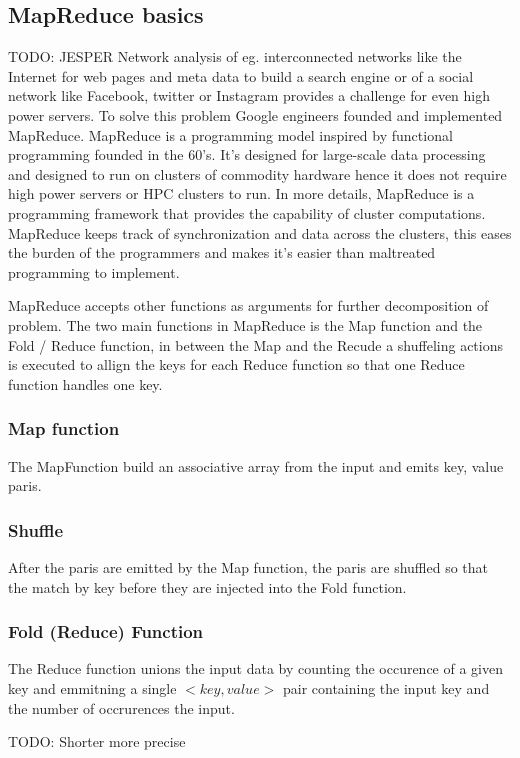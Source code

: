 \documentclass{article}
\begin{document}
\subsection{MapReduce basics}
TODO: JESPER
Network analysis of eg. interconnected networks like the Internet for web pages and meta data to build a search engine or of a social network like Facebook, twitter or Instagram provides a challenge for even high power servers. To solve this problem Google engineers founded and implemented MapReduce. MapReduce is a programming model inspired by functional programming founded in the 60's. It's designed for large-scale data processing and designed to run on clusters of commodity hardware hence it does not require high power servers or HPC clusters to run.
In more details, MapReduce is a programming framework that provides the capability of cluster computations. MapReduce keeps track of synchronization and data across the clusters, this eases the burden of the programmers and makes it's easier than maltreated programming to implement.

\noindent MapReduce accepts other functions as arguments for further decomposition of problem. The two main functions in MapReduce is the Map function and the Fold / Reduce function, in between the Map and the Recude a shuffeling actions is executed to allign the keys for each Reduce function so that one Reduce function handles one key.

\subsubsection{Map function}
The MapFunction build an associative array from the input and emits key, value paris.

\subsubsection{Shuffle}
After the paris are emitted by the Map function, the paris are shuffled so that the match by key before they are injected into the Fold function.

\subsubsection{Fold (Reduce) Function}
The Reduce function unions the input data by counting the occurence of a given key and emmitning a single $<key,value>$ pair containing the input key and the number of occrurences the input.

TODO: Shorter more precise
\end{document}
